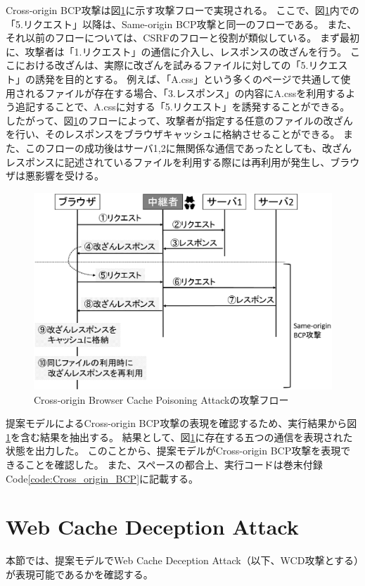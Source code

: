\documentclass[12pt,a4paper]{jbook}
\begin{document}
Cross-origin BCP攻撃は図\ref{fig:CrossBCP_flow}に示す攻撃フローで実現される。
ここで、図\ref{fig:CrossBCP_flow}内での「5.リクエスト」以降は、Same-origin BCP攻撃と同一のフローである。
また、それ以前のフローについては、CSRFのフローと役割が類似している。
まず最初に、攻撃者は「1.リクエスト」の通信に介入し、レスポンスの改ざんを行う。
ここにおける改ざんは、実際に改ざんを試みるファイルに対しての「5.リクエスト」の誘発を目的とする。
例えば、「A.css」という多くのページで共通して使用されるファイルが存在する場合、「3.レスポンス」の内容にA.cssを利用するよう追記することで、A.cssに対する「5.リクエスト」を誘発することができる。
したがって、図\ref{fig:CrossBCP_flow}のフローによって、攻撃者が指定する任意のファイルの改ざんを行い、そのレスポンスをブラウザキャッシュに格納させることができる。
また、このフローの成功後はサーバ1,2に無関係な通信であったとしても、改ざんレスポンスに記述されているファイルを利用する際には再利用が発生し、ブラウザは悪影響を受ける。

\begin{figure}[htb]
\centering
\includegraphics[width=450pt]{./fig/CrossBCP_flow.eps}
\caption{Cross-origin Browser Cache Poisoning Attackの攻撃フロー}
\label{fig:CrossBCP_flow}
\end{figure}

提案モデルによるCross-origin BCP攻撃の表現を確認するため、実行結果から図\ref{fig:CrossBCP_flow}を含む結果を抽出する。
結果として、図\ref{fig:CrossBCP_flow}に存在する五つの通信を表現された状態を出力した。
このことから、提案モデルがCross-origin BCP攻撃を表現できることを確認した。
また、スペースの都合上、実行コードは巻末付録Code\ref{code:Cross_origin_BCP}に記載する。

\section{Web Cache Deception Attack}
本節では、提案モデルでWeb Cache Deception Attack\cite{WCD}（以下、WCD攻撃とする）が表現可能であるかを確認する。
\end{document}
